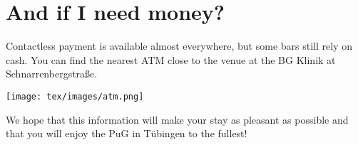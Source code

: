 \section*{And if I need money?}

Contactless payment is available almost everywhere, but some bars still rely on cash. You can find the nearest ATM close to the venue at the BG Klinik at Schnarrenbergstraße.

\begin{center}
\texttt{[image: tex/images/atm.png]}
\end{center}


We hope that this information will make your stay as pleasant as possible and that you will enjoy the PuG in Tübingen to the fullest!

